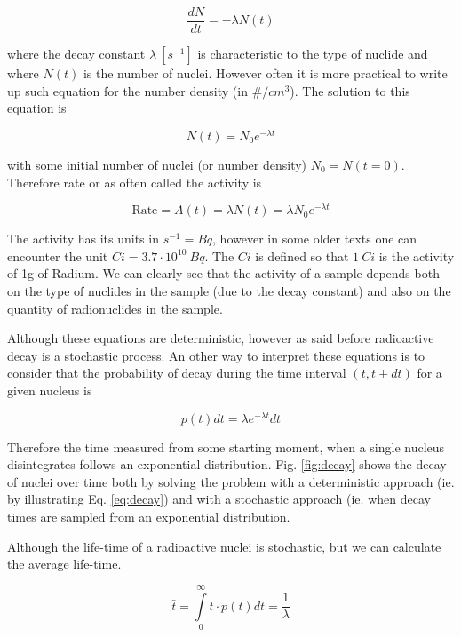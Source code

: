 \begin{equation}
\frac{dN}{dt}=-\lambda N(t)
\end{equation}

where the decay constant $\lambda \: [s^{-1}]$ is characteristic to the type of nuclide and where $N(t)$ is the number of nuclei. However often it is more practical to write up such equation for the number density (in $\#/cm^3$). The solution to this equation is

\begin{equation}\label{eq:decay}
N(t)=N_0e^{-\lambda t}
\end{equation}

with some initial number of nuclei (or number density) $N_0=N(t=0)$. Therefore rate or as often called the activity is

\begin{equation}
\text{Rate}=A(t)=\lambda N(t)=\lambda N_0e^{-\lambda t}
\end{equation}

The activity has its units in $s^{-1}=Bq$, however in some older texts one can encounter the unit $Ci=3.7 \cdot 10^{10}\: Bq$. The $Ci$ is defined so that $1 \: Ci$ is the activity of 1g of Radium. We can clearly see that the activity of a sample depends both on the type of nuclides in the sample (due to the decay constant) and also on the quantity of radionuclides in the sample.

Although these equations are deterministic, however as said before radioactive decay is a stochastic process. An other way to interpret these equations is to consider that the probability of decay during the time interval $(t,t+dt)$ for a given nucleus is

\begin{equation}
p(t)dt=\lambda e^{-\lambda t}dt
\end{equation}

Therefore the time measured from some starting moment, when a single nucleus disintegrates follows an exponential distribution. Fig. \ref{fig:decay} shows the decay of nuclei over time both by solving the problem with a deterministic approach (ie. by illustrating Eq. \eqref{eq:decay}) and with a stochastic approach (ie. when decay times are sampled from an exponential distribution. 

Although the life-time of a radioactive nuclei is stochastic, but we can calculate the average life-time.

\begin{equation}
\bar{t}=\int\limits_0^\infty{t\cdot p(t) dt}=\frac{1}{\lambda}
\end{equation}

